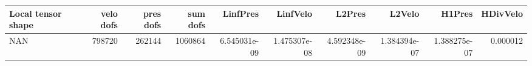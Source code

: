 \begin{tabular}{lrrrrrrrrr}
\toprule
Local tensor shape &  velo dofs &  pres dofs &  sum dofs &     LinfPres &     LinfVelo &       L2Pres &       L2Velo &       H1Pres &  HDivVelo \\
\midrule
               NAN &     798720 &     262144 &   1060864 & 6.545031e-09 & 1.475307e-08 & 4.592348e-09 & 1.384394e-07 & 1.388275e-07 &  0.000012 \\
\bottomrule
\end{tabular}
